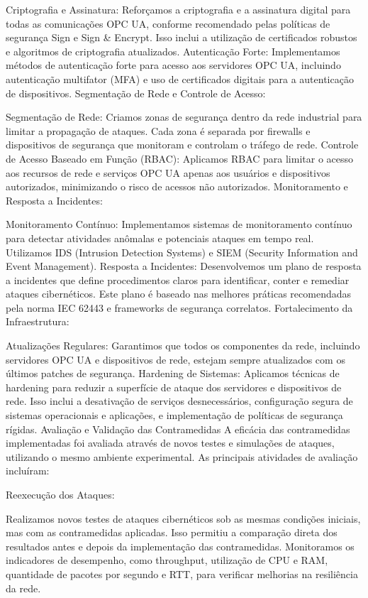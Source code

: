 {    Criptografia e Assinatura: Reforçamos a criptografia e a assinatura digital para todas as comunicações OPC UA, conforme recomendado pelas políticas de segurança Sign e Sign \& Encrypt. Isso inclui a utilização de certificados robustos e algoritmos de criptografia atualizados.
    Autenticação Forte: Implementamos métodos de autenticação forte para acesso aos servidores OPC UA, incluindo autenticação multifator (MFA) e uso de certificados digitais para a autenticação de dispositivos.
    Segmentação de Rede e Controle de Acesso:

    Segmentação de Rede: Criamos zonas de segurança dentro da rede industrial para limitar a propagação de ataques. Cada zona é separada por firewalls e dispositivos de segurança que monitoram e controlam o tráfego de rede.
    Controle de Acesso Baseado em Função (RBAC): Aplicamos RBAC para limitar o acesso aos recursos de rede e serviços OPC UA apenas aos usuários e dispositivos autorizados, minimizando o risco de acessos não autorizados.
    Monitoramento e Resposta a Incidentes:

    Monitoramento Contínuo: Implementamos sistemas de monitoramento contínuo para detectar atividades anômalas e potenciais ataques em tempo real. Utilizamos IDS (Intrusion Detection Systems) e SIEM (Security Information and Event Management).
    Resposta a Incidentes: Desenvolvemos um plano de resposta a incidentes que define procedimentos claros para identificar, conter e remediar ataques cibernéticos. Este plano é baseado nas melhores práticas recomendadas pela norma IEC 62443 e frameworks de segurança correlatos.
    Fortalecimento da Infraestrutura:

    Atualizações Regulares: Garantimos que todos os componentes da rede, incluindo servidores OPC UA e dispositivos de rede, estejam sempre atualizados com os últimos patches de segurança.
    Hardening de Sistemas: Aplicamos técnicas de hardening para reduzir a superfície de ataque dos servidores e dispositivos de rede. Isso inclui a desativação de serviços desnecessários, configuração segura de sistemas operacionais e aplicações, e implementação de políticas de segurança rígidas.
    Avaliação e Validação das Contramedidas
    A eficácia das contramedidas implementadas foi avaliada através de novos testes e simulações de ataques, utilizando o mesmo ambiente experimental. As principais atividades de avaliação incluíram:

    Reexecução dos Ataques:

    Realizamos novos testes de ataques cibernéticos sob as mesmas condições iniciais, mas com as contramedidas aplicadas. Isso permitiu a comparação direta dos resultados antes e depois da implementação das contramedidas. Monitoramos os indicadores de desempenho, como throughput, utilização de CPU e RAM, quantidade de pacotes por segundo e RTT, para verificar melhorias na resiliência da rede.

}
